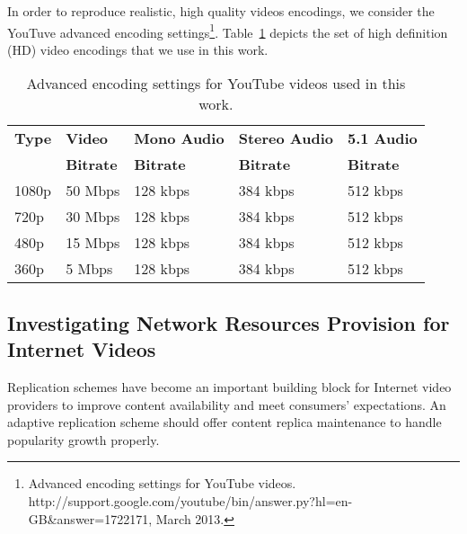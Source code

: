 In order to reproduce realistic, high quality videos encodings, we consider the YouTuve advanced encoding settings\footnote{Advanced encoding settings for YouTube videos. http://support.google.com/youtube/bin/answer.py?hl=en-GB\&answer=1722171, March 2013.}. Table~\ref{tab:youtube_encodings} depicts the set of high definition (HD) video encodings that we use in this work. 

\begin{table}
  \label{tab:motivation_advanced_encodings}
	\begin{center}
		\caption{Advanced encoding settings for YouTube videos used in this work.}
  		\label{tab:youtube_encodings}
		\begin{tabular}{p{1.1cm}||p{1.7cm} p{2.5cm} p{2.5cm} p{2cm}}
			{\bf Type}&{\bf Video}&{\bf Mono Audio}&{\bf Stereo Audio}&{\bf 5.1 Audio}\\
			&{\bf Bitrate}&{\bf Bitrate}&{\bf Bitrate}&{\bf Bitrate}\\
			\hline
			\hline
			1080p&50 Mbps&128 kbps&384 kbps&512 kbps\\
			720p&30 Mbps&128 kbps&384 kbps&512 kbps\\
			480p&15 Mbps&128 kbps&384 kbps&512 kbps\\
			360p&5 Mbps&128 kbps&384 kbps&512 kbps\\
		\end{tabular}
	\end{center}
\end{table}

\subsection{Investigating Network Resources Provision for Internet Videos}



Replication schemes have become an important building block for Internet video providers to improve content availability and meet consumers' expectations. 
An adaptive replication scheme should offer content replica maintenance to handle popularity growth properly.

